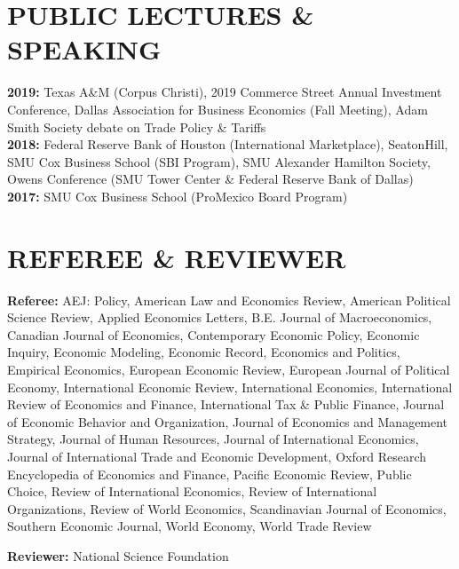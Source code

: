 \documentclass[11pt]{res}
\begin{document}
\begin{resume}
\section{PUBLIC LECTURES \& SPEAKING}\vspace{1.5mm}
{\bf 2019:} Texas A\&M (Corpus Christi), 2019 Commerce Street Annual Investment Conference, Dallas Association for Business Economics (Fall Meeting), Adam Smith Society debate on Trade Policy \& Tariffs\vspace{1.5mm}\\
{\bf 2018:} Federal Reserve Bank of Houston (International Marketplace), SeatonHill, SMU Cox Business School (SBI Program), SMU Alexander Hamilton Society, Owens Conference (SMU Tower Center \& Federal Reserve Bank of Dallas)\vspace{1.5mm}\\
{\bf 2017:} SMU Cox Business School (ProMexico Board Program)

\section{REFEREE \& REVIEWER} \vspace{1.5mm}
{\bf Referee:} AEJ: Policy, American Law and Economics Review, American Political Science Review, Applied Economics Letters, B.E. Journal of Macroeconomics, Canadian Journal of Economics, Contemporary Economic Policy, Economic Inquiry, Economic Modeling, Economic Record, Economics and Politics, Empirical Economics, European Economic Review, European Journal of Political Economy, International Economic Review, International Economics, International Review of Economics and Finance, International Tax \& Public Finance, Journal of Economic Behavior and Organization, Journal of Economics and Management Strategy, Journal of Human Resources, Journal of International Economics, Journal of International Trade and Economic Development, Oxford Research Encyclopedia of Economics and Finance, Pacific Economic Review, Public Choice, Review of International Economics, Review of International Organizations, Review of World Economics, Scandinavian Journal of Economics, Southern Economic Journal, World Economy, World Trade Review

{\bf Reviewer:} National Science Foundation


\end{resume}
\end{document}

